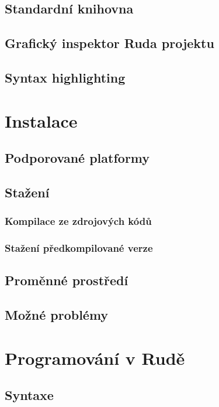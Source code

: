 \documentclass[12pt, a4paper,
twoside,        %
openright
]{report}
\begin{document}
\section{Standardní knihovna}

\section{Grafický inspektor Ruda projektu}

\section{Syntax highlighting}

\chapter{Instalace}

\section{Podporované platformy}

\section{Stažení}

\subsection{Kompilace ze zdrojových kódů}

\subsection{Stažení předkompilované verze}

\section{Proměnné prostředí}

\section{Možné problémy}

\chapter{Programování v Rudě}

\section{Syntaxe}
\end{document}
